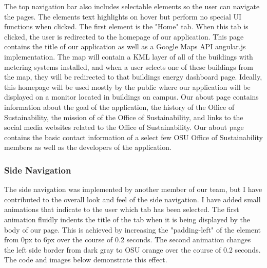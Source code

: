 \documentclass[letterpaper,10pt,serif,draftclsnofoot,onecolumn,compsoc,titlepage]{IEEEtran}
\begin{document}
		The top navigation bar also includes selectable elements so the user can navigate the pages. The elements text highlights on hover but perform no special UI functions
		when clicked. 
			The first element is the "Home" tab. When this tab is clicked, the user is redirected to the homepage of our application. This page contains the title of our 
			application as well as a Google Maps API angular.js implementation. The map will contain a KML layer of all of the buildings with metering systems installed, and 
			when a user selects one of these buildings from the map, they will be redirected to that buildings energy dashboard page. Ideally, this homepage will be used
			mostly by the public where our application will be displayed on a monitor located in buildings on campus.
			Our about page contains information about the goal of the application, the history of the Office of Sustainability, the mission of of the Office of Sustainability,
			and links to the social media websites related to the Office of Sustainability.
			Our about page contains the basic contact information of a select few OSU Office of Sustainability members as well as the developers of the application.
			
	\subsubsection{Side Navigation}
	The side navigation was implemented by another member of our team, but I have contributed to the overall look and feel of the side navigation. I have added small
	animations that indicate to the user which tab has been selected. The first animation fluidly indents the title of the tab when it is being displayed by the 
	body of our page. This is achieved by increasing the "padding-left" of the element from 0px to 6px over the course of 0.2 seconds. The second animation changes the 
	left side border from dark gray to OSU orange over the course of 0.2 seconds. The code and images below demonstrate this effect.
	
\end{document}
